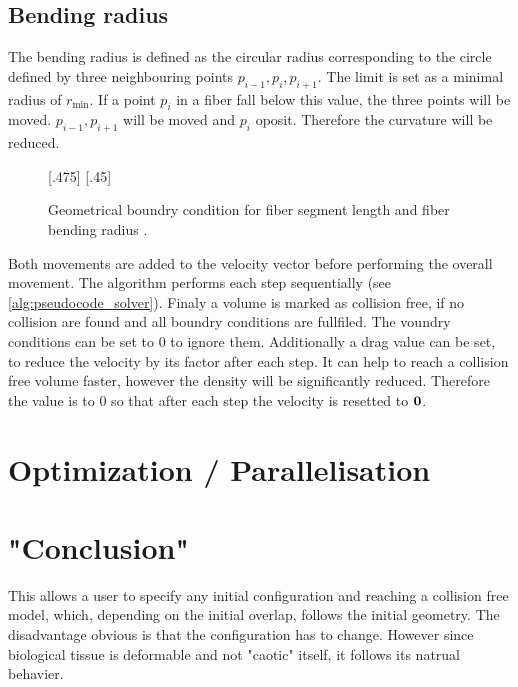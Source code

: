 \subsection{Bending radius}
% 
The bending radius is defined as the circular radius corresponding to the circle defined by three neighbouring points $p_{i-1}, p_{i}, p_{i+1}$. 
The limit is set as a minimal radius of $r_{\min}$.
If a point $p_{i}$ in a fiber fall below this value, the three points will be moved.
$p_{i-1},p_{i+1}$ will be moved \dummy and $p_{i}$ oposit.
Therefore the curvature will be reduced.
% 
\begin{figure}[!t]
    \centering
    \def\tikzheight{.40\textwidth}
    [.475\textwidth]{
    }\hfill
    [.45\textwidth]{
    }
	\caption{Geometrical boundry condition for fiber segment length \segLength and fiber bending radius \segRadius.}
	\label{fig:model_circle}
\end{figure}
% 
\newline
Both movements are added to the velocity vector before performing the overall movement.
The algorithm performs each step sequentially (see \cref{alg:pseudocode_solver}).
% 
Finaly a volume is marked as collision free, if no collision are found and all boundry conditions are fullfiled. 
The voundry conditions can be set to 0 to ignore them.
Additionally a drag value can be set, to reduce the velocity by its factor after each step.
It can help to reach a collision free volume faster, however the density will be significantly reduced.
Therefore the value is to 0 so that after each step the velocity is resetted to $\mathbf{0}$. 
% 
\section{Optimization / Parallelisation}
% 
\section{"Conclusion"}
This allows a user to specify any initial configuration and reaching a collision free model, which, depending on the initial overlap, follows the initial geometry.
The disadvantage obvious is that the configuration has to change.
However since biological tissue is deformable and not "caotic" itself, it follows its natrual behavier.
% 
